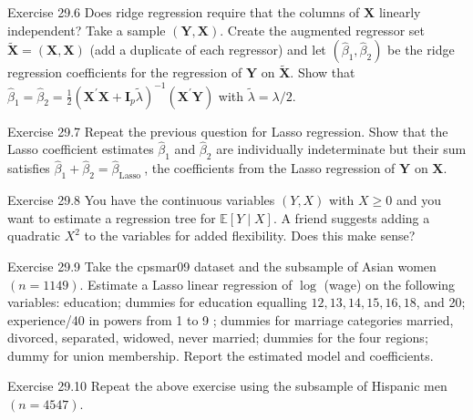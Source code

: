 \documentclass[10pt]{article}
\begin{document}
Exercise 29.6 Does ridge regression require that the columns of $\boldsymbol{X}$ linearly independent? Take a sample $(\boldsymbol{Y}, \boldsymbol{X})$. Create the augmented regressor set $\widetilde{\boldsymbol{X}}=(\boldsymbol{X}, \boldsymbol{X})$ (add a duplicate of each regressor) and let $\left(\widehat{\beta}_{1}, \widehat{\beta}_{2}\right)$ be the ridge regression coefficients for the regression of $\boldsymbol{Y}$ on $\widetilde{\boldsymbol{X}}$. Show that $\widehat{\beta}_{1}=\widehat{\beta}_{2}=\frac{1}{2}\left(\boldsymbol{X}^{\prime} \boldsymbol{X}+\boldsymbol{I}_{p} \widetilde{\lambda}\right)^{-1}\left(\boldsymbol{X}^{\prime} \boldsymbol{Y}\right)$ with $\widetilde{\lambda}=\lambda / 2$.

Exercise 29.7 Repeat the previous question for Lasso regression. Show that the Lasso coefficient estimates $\widehat{\beta}_{1}$ and $\widehat{\beta}_{2}$ are individually indeterminate but their sum satisfies $\widehat{\beta}_{1}+\widehat{\beta}_{2}=\widehat{\beta}_{\text {Lasso }}$, the coefficients from the Lasso regression of $\boldsymbol{Y}$ on $\boldsymbol{X}$.

Exercise 29.8 You have the continuous variables $(Y, X)$ with $X \geq 0$ and you want to estimate a regression tree for $\mathbb{E}[Y \mid X]$. A friend suggests adding a quadratic $X^{2}$ to the variables for added flexibility. Does this make sense?

Exercise 29.9 Take the cpsmar09 dataset and the subsample of Asian women $(n=1149)$. Estimate a Lasso linear regression of $\log$ (wage) on the following variables: education; dummies for education equalling $12,13,14,15,16,18$, and 20; experience/40 in powers from 1 to 9 ; dummies for marriage categories married, divorced, separated, widowed, never married; dummies for the four regions; dummy for union membership. Report the estimated model and coefficients.

Exercise 29.10 Repeat the above exercise using the subsample of Hispanic men $(n=4547)$.
\end{document}
